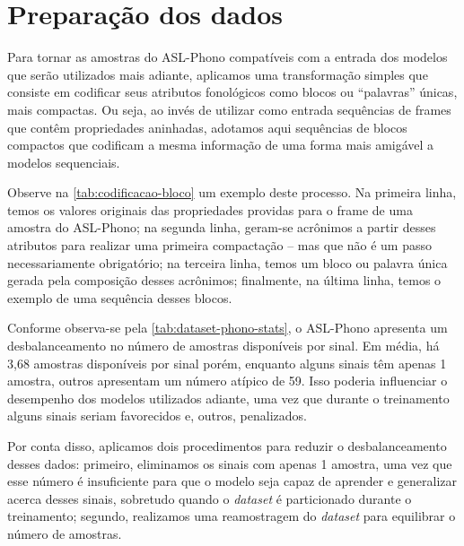 
\section{Preparação dos dados}
\label{sec:metodologia-preparacao-dados}

Para tornar as amostras do ASL-Phono compatíveis com a entrada dos modelos que serão utilizados mais adiante, aplicamos uma transformação simples que consiste em codificar seus atributos fonológicos como blocos ou ``palavras'' únicas, mais compactas. Ou seja, ao invés de utilizar como entrada sequências de frames que contêm propriedades aninhadas, adotamos aqui sequências de blocos compactos que codificam a mesma informação de uma forma mais amigável a modelos sequenciais.

Observe na \autoref{tab:codificacao-bloco} um exemplo deste processo. Na primeira linha, temos os valores originais das propriedades providas para o frame de uma amostra do ASL-Phono; na segunda linha, geram-se acrônimos a partir desses atributos para realizar uma primeira compactação -- mas que não é um passo necessariamente obrigatório; na terceira linha, temos um bloco ou palavra única gerada pela composição desses acrônimos; finalmente, na última linha, temos o exemplo de uma sequência desses blocos.





Conforme observa-se pela \autoref{tab:dataset-phono-stats}, o ASL-Phono apresenta um desbalanceamento no número de amostras disponíveis por sinal. Em média, há 3,68 amostras disponíveis por sinal porém, enquanto alguns sinais têm apenas 1 amostra, outros apresentam um número atípico de 59. Isso poderia influenciar o desempenho dos modelos utilizados adiante, uma vez que durante o treinamento alguns sinais seriam favorecidos e, outros, penalizados. 

Por conta disso, aplicamos dois procedimentos para reduzir o desbalanceamento desses dados: primeiro, eliminamos os sinais com apenas 1 amostra, uma vez que esse número é insuficiente para que o modelo seja capaz de aprender e generalizar acerca desses sinais, sobretudo quando o \textit{dataset} é particionado durante o treinamento; segundo, realizamos uma reamostragem do \textit{dataset} para equilibrar o número de amostras.

